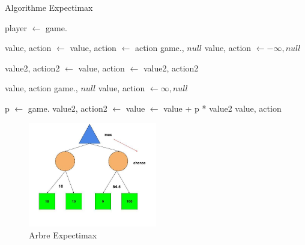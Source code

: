 \begin{algorithm}[H]
    \caption{Algorithme Expectimax}\label{alg:expectimax}
    \begin{algorithmic}
        \State player $\leftarrow$ game.
        
            \State value, action $\leftarrow$  
        \Else 
            \State value, action $\leftarrow$ 
        \EndIf
        \State \Return action
        \EndFunction
        \vspace{0.5cm}
            \State \Return game., $null$
        \EndIf 
        \State value, action $\leftarrow -\infty, null$

            \State value2, action2 $\leftarrow$ 
                \State value, action $\leftarrow$ value2, action2
            \EndIf
        \EndFor

        \Return value, action
        \EndFunction
        \vspace{0.5cm}
            \State \Return game., $null$
        \EndIf 
        \State value, action $\leftarrow \infty, null$ 

        \State p $\leftarrow$ game.
        \State value2, action2 $\leftarrow$ %
        \State value $\leftarrow$ value + p * value2
        \EndFor
        \State \Return value, action
        \EndFunction
    \end{algorithmic} 
\end{algorithm}

\begin{figure}
    \begin{center}
        \includegraphics[width=0.5\textwidth]{pictures/expectimaxdrawing.png}
    \end{center}
    \caption{Arbre Expectimax}\label{fig:expectimaxtree}
\end{figure}


